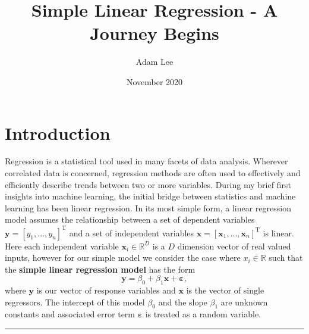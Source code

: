 \documentclass[10pt,a4paper, twocolumn, conference]{IEEEtran}
\author{Adam Lee}
\title{Simple Linear Regression - A Journey Begins}
\date{November 2020}
\begin{document}
\maketitle
\pagebreak
\section{Introduction}
Regression is a statistical tool used in many facets of data analysis.  Wherever correlated data is concerned, regression methods are often used to effectively and efficiently describe trends between two or more variables. During my brief first insights into machine learning, the initial bridge between statistics and machine learning has been linear regression. In its most simple form, a linear regression model assumes the relationship between a set of dependent variables $\mathbf{y} = \left[ y_1, \ldots, y_n \right] ^{\text{T}}$ and a set of independent variables $\mathbf{x} = \left[ \mathbf{x}_1, \ldots, \mathbf{x}_n \right] ^{\text{T}}$ is linear. Here each independent variable $\mathbf{x}_i \in \mathbb{R}^{D}$ is a $D$ dimension vector of real valued inputs, however for our simple model we consider the case where $x_i \in \mathbb{R}$ such that the \textbf{simple linear regression model} has the form
\begin{equation} \label{eq1}
\mathbf{y} = \beta_0 + \beta_1 \mathbf{x} + \boldsymbol\varepsilon,
\end{equation}
where $\mathbf{y}$ is our vector of response variables and $\mathbf{x}$ is the vector of single regressors. The intercept of this model $\beta_0$ and the slope $\beta_1$ are unknown constants and associated error term $\boldsymbol\varepsilon$ is treated as a random variable.
\vspace{3mm}
\hrule
\end{document}
